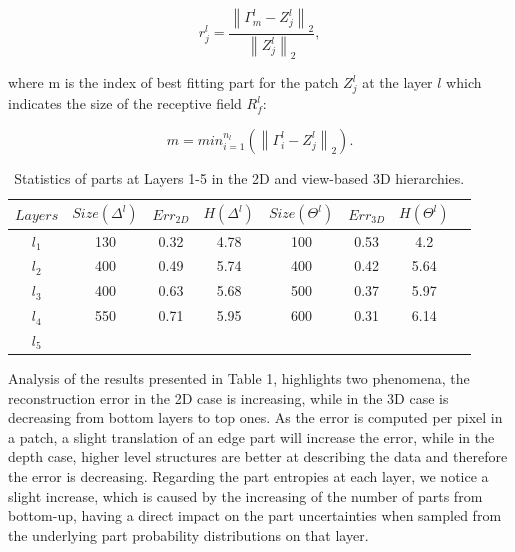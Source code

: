 \documentclass[runningheads]{llncs}
\begin{document}
\begin{equation}
 r_j^l = \frac{\left\|\Gamma_m^l-Z_j^l\right\|_2}{\left\|Z_j^l\right\|_2}, \end{equation}
 
 where m is the index of best fitting part for the patch $Z_j^l$ at the layer $l$ which indicates the size of the receptive field $R_f^l$:
 
\begin{equation}
 m=min_{i=1}^{n_l}(\left\|\Gamma_i^l-Z_j^l\right\|_2).
\end{equation}

 \begin{table}
 \begin{center}
  \begin{tabular}{ | c | c | c | c | c | c | c |r |}
      \hline
      $Layers$  & $Size(\Delta^l)$ & $Err_{2D}$ & $H(\Delta^l)$ &  $Size(\Theta^l)$ & $Err_{3D}$ & $H(\Theta^l)$  \\ \hline
    $l_1$ &  130  & 0.32 & 4.78 & 100 & 0.53 & 4.2 \\ \hline
    $l_2$ &  400 & 0.49 & 5.74 & 400 & 0.42 & 5.64 \\ \hline
    $l_3$ &  400 & 0.63 & 5.68 & 500 & 0.37 & 5.97 \\ \hline 
    $l_4$ &  550 & 0.71 & 5.95 & 600 & 0.31 & 6.14 \\ \hline
    $l_5$ &   &  &  &  &  &  \\ 
    \hline
  \end{tabular}
\end{center}
\caption{Statistics of parts at Layers 1-5 in the 2D and view-based 3D hierarchies.}
\end{table}

Analysis of the results presented in Table 1, highlights two phenomena, the reconstruction error in the 2D case is increasing, while in the 3D case is decreasing from bottom layers to top ones. As the error is computed per pixel in a patch, a slight translation of an edge part will increase the error, while in the depth case, higher level structures are better at describing the data and therefore the error is decreasing. Regarding the part entropies at each layer, we notice a slight increase, which is caused by the increasing of the number of parts from bottom-up, having a direct impact on the part uncertainties when sampled from the underlying part probability distributions on that layer.
\end{document}
